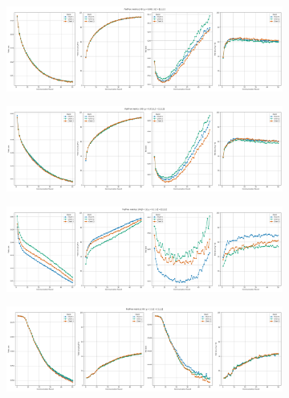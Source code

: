 \begin{figure}[H]
    \centering

    \begin{subfigure}{\linewidth}
        \centering
        \includegraphics[width=\linewidth]{figures/2-Federated_Learning/FedProx_IID_Mu_0.001.png}
    \end{subfigure}
    \vspace{1em} %

    \begin{subfigure}{\linewidth}
        \centering
        \includegraphics[width=\linewidth]{figures/2-Federated_Learning/FedProx_IID_Mu_0.01.png}
    \end{subfigure}
    \vspace{1em} %

    \begin{subfigure}{\linewidth}
        \centering
        \includegraphics[width=\linewidth]{figures/2-Federated_Learning/FedProx_Dirichlet_1_mu_0.1.png}
    \end{subfigure}
    \vspace{1em} %

    \begin{subfigure}{\linewidth}
        \centering
        \includegraphics[width=\linewidth]{figures/2-Federated_Learning/FedProx_IID_Mu_1.png}
    \end{subfigure}


\end{figure}
